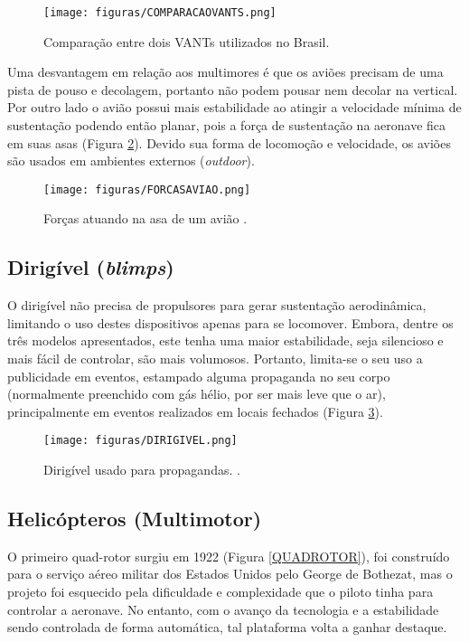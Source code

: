 \begin{figure}
	\centering
	\texttt{[image: figuras/COMPARACAOVANTS.png]}
    \caption{Comparação entre dois VANTs utilizados no Brasil.}
    \label{COMPARACAOVANTS}
\end{figure}

Uma desvantagem em relação aos multimores é que os aviões precisam de uma pista de pouso e decolagem, portanto não podem pousar nem decolar na vertical. Por outro lado o avião possui mais estabilidade ao atingir a velocidade mínima de sustentação podendo então planar, pois a força de sustentação na aeronave fica em suas asas (Figura \ref{FORCASAVIAO}). Devido sua forma de locomoção e velocidade, os aviões são usados em ambientes externos (\textit{outdoor}).

\begin{figure}
	\centering
	\texttt{[image: figuras/FORCASAVIAO.png]}
    \caption{Forças atuando na asa de um avião \cite{FisicaCotidiano}.}
    \label{FORCASAVIAO}
\end{figure}

\subsection{Dirigível (\textit{blimps})}
O dirigível não precisa de propulsores para gerar sustentação aerodinâmica, limitando o uso destes dispositivos apenas para se locomover. Embora, dentre os três modelos apresentados, este tenha uma maior estabilidade, seja silencioso e mais fácil de controlar, são mais volumosos. Portanto, limita-se o seu uso a publicidade em eventos, estampado alguma propaganda no seu corpo (normalmente preenchido com gás hélio, por ser mais leve que o ar), principalmente em eventos realizados em locais fechados (Figura \ref{DIRIGIVEL}).

\begin{figure}
	\centering
	\texttt{[image: figuras/DIRIGIVEL.png]}
    \caption{Dirigível usado para propagandas. \cite{NDalalBTriggs}.}
    \label{DIRIGIVEL}
\end{figure}

\subsection{Helicópteros (Multimotor)}
O primeiro quad-rotor surgiu em 1922 (Figura \ref{QUADROTOR}), foi construído para o serviço aéreo militar dos Estados Unidos pelo George de Bothezat, mas o projeto foi esquecido pela dificuldade e complexidade que o piloto tinha para controlar a aeronave. No entanto, com o avanço da tecnologia e a estabilidade sendo controlada de forma automática, tal plataforma volta a ganhar destaque.

